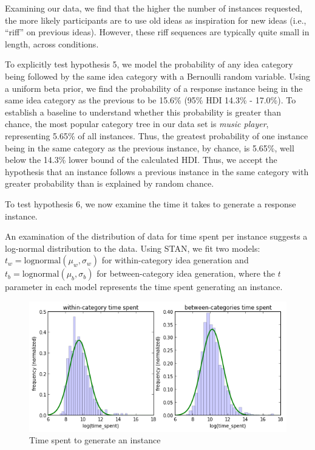 Examining our data, we find that the higher the number of instances requested, the more likely participants are to use old ideas as inspiration for new ideas (i.e., ``riff'' on previous ideas). However, these riff sequences are typically quite small in length, across conditions.

To explicitly test hypothesis 5, we model the probability of any idea category being followed by the same idea category with a Bernoulli random variable. Using a uniform beta prior, we find the probability of a response instance being in the same idea category as the previous to be 15.6\% (95\% HDI 14.3\% - 17.0\%). To establish a baseline to understand whether this probability is greater than chance, the most popular category tree in our data set is \emph{music player}, representing 5.65\% of all instances. Thus, the greatest probability of one instance being in the same category as the previous instance, by chance, is 5.65\%, well below the 14.3\% lower bound of the calculated HDI. Thus, we accept the hypothesis that an instance follows a previous instance in the same category with greater probability than is explained by random chance.

To test hypothesis 6, we now examine the time it takes to generate a response instance.

An examination of the distribution of data for time spent per instance suggests a log-normal distribution to the data. Using STAN, we fit two models: $t_w = \text{lognormal}(\mu_w, \sigma_w)$ for within-category idea generation and $t_b = \text{lognormal}(\mu_b, \sigma_b)$ for between-category idea generation, where the $t$ parameter in each model represents the time spent generating an instance.

\begin{figure}[h]
    \centering
    \includegraphics[width=0.9\columnwidth]{hyp5_comparison}
    \caption{Time spent to generate an instance}
\end{figure}

